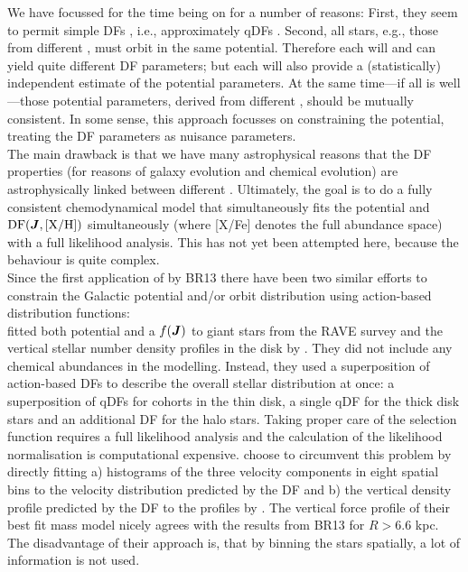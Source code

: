 
 We have focussed for the time being on \MAPs{} for a number of reasons: First, they seem to permit simple DFs \citep{bov12b,bov12c,2012ApJ...753..148B}, i.e., approximately qDFs \citep{2013MNRAS.434..652T}. Second, all stars, e.g., those from different \MAPs{}, must orbit in the same potential. Therefore each \MAP{} will and can yield quite different DF parameters; but each \MAP{} will also provide a (statistically) independent estimate of the potential parameters. At the same time---if all is well---those potential parameters, derived from different \MAPs{}, should be mutually consistent. In some sense, this approach focusses on constraining the potential, treating the DF parameters as nuisance parameters.
\\The main drawback is that we have many astrophysical reasons that the DF properties (for reasons of galaxy evolution and chemical evolution) are astrophysically linked between different \MAPs{}. Ultimately, the goal is to do a fully consistent chemodynamical model that simultaneously fits the potential and $\text{DF}(\boldsymbol{J},\text{[X/H]})$ simultaneously (where [X/Fe] denotes the full abundance space) with a full likelihood analysis. This has not yet been attempted here, because the behaviour is quite complex. 
\\Since the first application of \RM{} by BR13 there have been two similar efforts to constrain the Galactic potential and/or orbit distribution using action-based distribution functions:
\\\citet{2014MNRAS.445.3133P} fitted both potential and a $f(\boldsymbol{J})$ to giant stars from the RAVE survey \citep{2006AJ....132.1645S} and the vertical stellar number density profiles in the disk by \citet{2008ApJ...673..864J}. They did not include any chemical abundances in the modelling. Instead, they used a superposition of action-based DFs to describe the overall stellar distribution at once: a superposition of qDFs for cohorts in the thin disk, a single qDF \Wilma{[TO DO: CHECK]} for the thick disk stars and an additional DF for the halo stars. Taking proper care of the selection function requires a full likelihood analysis and the calculation of the likelihood normalisation is computational expensive. \citet{2014MNRAS.445.3133P} choose to circumvent this problem by directly fitting a) histograms of the three velocity components in eight spatial bins to the velocity distribution predicted by the DF and b) the vertical density profile predicted by the DF to the profiles by \citet{2008ApJ...673..864J}. The vertical force profile of their best fit mass model nicely agrees with the results from BR13 for $R>6.6$ kpc. The disadvantage of their approach is, that by binning the stars spatially, a lot of information is not used.
